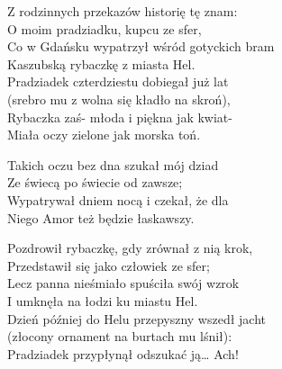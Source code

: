\begin{text}
    Z rodzinnych przekazów historię tę znam:\\
    O moim pradziadku, kupcu ze sfer,\\
    Co w Gdańsku wypatrzył wśród gotyckich bram\\
    Kaszubską rybaczkę z miasta Hel.\\
    Pradziadek czterdziestu dobiegał już lat\\
    (srebro mu z wolna się kładło na skroń),\\
    Rybaczka zaś- młoda i piękna jak kwiat-\\
    Miała oczy zielone jak morska toń.

    \vin Takich oczu bez dna szukał mój dziad\\
    \vin Ze świecą po świecie od zawsze;\\
    \vin Wypatrywał dniem nocą i czekał, że dla\\
    \vin Niego Amor też będzie łaskawszy.

    Pozdrowił rybaczkę, gdy zrównał z nią krok,\\
    Przedstawił się jako człowiek ze sfer;\\
    Lecz panna nieśmiało spuściła swój wzrok\\
    I umknęła na łodzi ku miastu Hel.\\
    Dzień później do Helu przepyszny wszedł jacht\\
    (złocony ornament na burtach mu lśnił):\\
    Pradziadek przypłynął odszukać ją… Ach!
\end{text}
\begin{chord}

\end{chord}